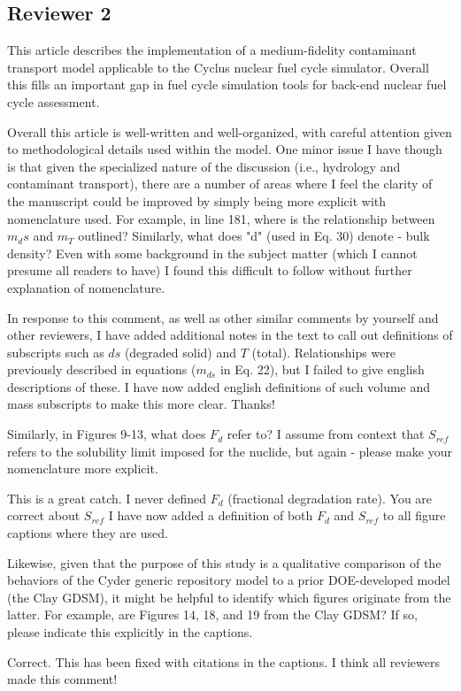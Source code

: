 \documentclass[answers,12pt]{exam}
\begin{document}
\begin{questions}
\section*{Reviewer 2}

\question This article describes the implementation of a medium-fidelity contaminant transport model applicable to the Cyclus nuclear fuel cycle simulator. Overall this fills an important gap in fuel cycle simulation tools for back-end nuclear fuel cycle assessment.

Overall this article is well-written and well-organized, with careful attention given to methodological details used within the model. One minor issue I have though is that given the specialized nature of the discussion (i.e., hydrology and contaminant transport), there are a number of areas where I feel the clarity of the manuscript could be improved by simply being more explicit with nomenclature used. For example, in line 181, where is the relationship between $m_ds$ and $m_T$ outlined? Similarly, what does "d" (used in Eq. 30) denote - bulk density? Even with some background in the subject matter (which I cannot presume all readers to have) I found this difficult to follow without further explanation of nomenclature.
\begin{solution}
In response to this comment, as well as other similar comments by yourself and 
        other reviewers, I have added 
        additional notes in the text to call out  definitions of subscripts 
        such as $ds$ (degraded solid) and $T$ (total). Relationships were previously described in 
        equations ($m_{ds}$ in Eq. 22), but I failed to give english 
        descriptions of these. I have now added english definitions of such volume and 
        mass subscripts to make this more clear. Thanks! 
\end{solution}

\question Similarly, in Figures 9-13, what does $F_d$ refer to? I assume from 
context that $S_{ref}$ refers to the solubility limit imposed for the nuclide, but again - please make your nomenclature more explicit. 
\begin{solution}
        This is a great catch. I never defined $F_d$ (fractional degradation 
        rate). You are correct about $S_{ref}$ I have now added a definition of 
        both $F_d$ and $S_{ref}$ to all figure captions where they are used. 
\end{solution}

\question Likewise, given that the purpose of this study is a qualitative comparison of the behaviors of the Cyder generic repository model to a prior DOE-developed model (the Clay GDSM), it might be helpful to identify which figures originate from the latter. For example, are Figures 14, 18, and 19 from the Clay GDSM? If so, please indicate this explicitly in the captions. 
\begin{solution}
Correct. This has been fixed with citations in the captions. I think all reviewers made this comment! 
\end{solution}


\end{questions}
\end{document}
